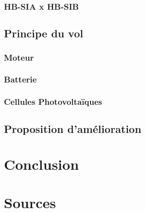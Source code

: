 \documentclass{beamer}
\begin{document}
\subsubsection{HB-SIA x HB-SIB}
\subsection{Principe du vol}
\subsubsection{Moteur}
\subsubsection{Batterie}
\subsubsection{Cellules Photovoltaïques}
\subsection{Proposition d'amélioration}

\section{Conclusion}
\section{Sources}
\end{document}
